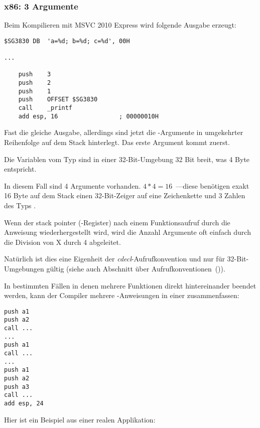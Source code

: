 \subsubsection{x86: 3 Argumente}


Beim Kompilieren mit MSVC 2010 Express wird folgende Ausgabe erzeugt:

\begin{lstlisting}[style=customasmx86]
$SG3830	DB	'a=%d; b=%d; c=%d', 00H

...

	push	3
	push	2
	push	1
	push	OFFSET $SG3830
	call	_printf
	add	esp, 16					; 00000010H
\end{lstlisting}

Fast die gleiche Ausgabe, allerdings sind jetzt die \printf-Argumente in umgekehrter Reihenfolge
auf dem Stack hinterlegt. Das erste Argument kommt zuerst.

Die Variablen vom Typ \Tint sind in einer 32-Bit-Umgebung 32 Bit breit, was 4 Byte entspricht.

In diesem Fall sind 4 Argumente vorhanden. $4*4 = 16$~---diese benötigen exakt 16 Byte auf dem Stack
einen 32-Bit-Zeiger auf eine Zeichenkette und 3 Zahlen des Typs \Tint.

Wenn der \gls{stack pointer} (\ESP-Register) nach einem Funktionsaufruf durch die Anweisung
 wiederhergestellt wird, wird die Anzahl Argumente oft einfach durch
die Division von X durch 4 abgeleitet.

Natürlich ist dies eine Eigenheit der \emph{cdecl}-Aufrufkonvention und nur für 32-Bit-Umgebungen gültig
(siehe auch Abschnitt über Aufrufkonventionen~()).

In bestimmten Fällen in denen mehrere Funktionen direkt hintereinander beendet werden, kann
der Compiler mehrere -Anweisungen in einer zusammenfassen:

\begin{lstlisting}[style=customasmx86]
push a1
push a2
call ...
...
push a1
call ...
...
push a1
push a2
push a3
call ...
add esp, 24
\end{lstlisting}

Hier ist ein Beispiel aus einer realen Applikation:



